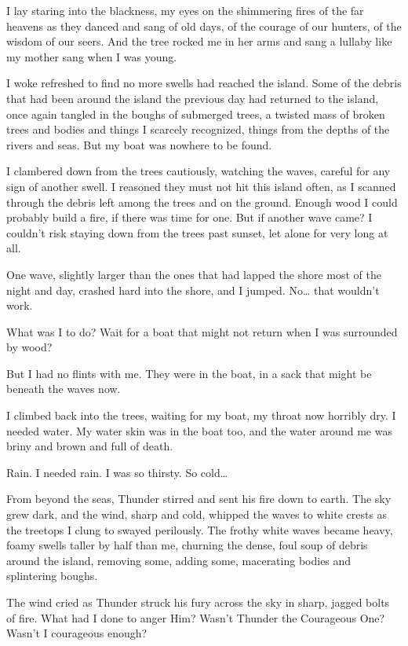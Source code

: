 I lay staring into the blackness, my eyes on the shimmering fires of the far heavens as they danced and sang of old days, of the courage of our hunters, of the wisdom of our seers. And the tree rocked me in her arms and sang a lullaby like my mother sang when I was young.

I woke refreshed to find no more swells had reached the island. Some of the debris that had been around the island the previous day had returned to the island, once again tangled in the boughs of submerged trees, a twisted mass of broken trees and bodies and things I scarcely recognized, things from the depths of the rivers and seas. But my boat was nowhere to be found.

I clambered down from the trees cautiously, watching the waves, careful for any sign of another swell. I reasoned they must not hit this island often, as I scanned through the debris left among the trees and on the ground. Enough wood I could probably build a fire, if there was time for one. But if another wave came? I couldn't risk staying down from the trees past sunset, let alone for very long at all.

One wave, slightly larger than the ones that had lapped the shore most of the night and day, crashed hard into the shore, and I jumped. No\ldots{} that wouldn't work.

What was I to do? Wait for a boat that might not return when I was surrounded by wood?

But I had no flints with me. They were in the boat, in a sack that might be beneath the waves now.

I climbed back into the trees, waiting for my boat, my throat now horribly dry. I needed water. My water skin was in the boat too, and the water around me was briny and brown and full of death.

Rain. I needed rain. I was so thirsty. So cold\ldots{}

From beyond the seas, Thunder stirred and sent his fire down to earth. The sky grew dark, and the wind, sharp and cold, whipped the waves to white crests as the treetops I clung to swayed perilously. The frothy white waves became heavy, foamy swells taller by half than me, churning the dense, foul soup of debris around the island, removing some, adding some, macerating bodies and splintering boughs.

The wind cried as Thunder struck his fury across the sky in sharp, jagged bolts of fire. What had I done to anger Him? Wasn't Thunder the Courageous One? Wasn't I courageous enough?

